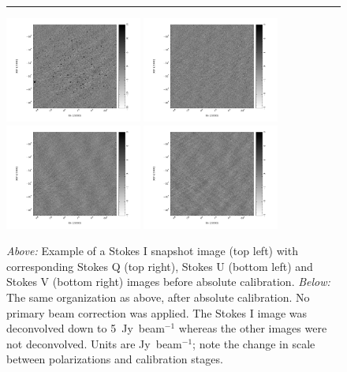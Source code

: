 \begin{figure}[h!]
\noindent\rule{14cm}{0.6pt}
\includegraphics[width=0.4\textwidth]{chapters/eor_window_PAPER/figures/zen_2455819_50285-I-image.pdf}
\includegraphics[width=0.4\textwidth]{chapters/eor_window_PAPER/figures/zen_2455819_50285-Q-image.pdf}
\includegraphics[width=0.4\textwidth]{chapters/eor_window_PAPER/figures/zen_2455819_50285-U-image.pdf}
\includegraphics[width=0.4\textwidth]{chapters/eor_window_PAPER/figures/zen_2455819_50285-V-image.pdf}
\caption[Snapshot images of Stokes parameters before and absolute calibration.]{\textit{Above:} Example of a Stokes I snapshot image (top left) with corresponding Stokes Q (top right), Stokes U (bottom left) and Stokes V (bottom right) images before absolute calibration. \textit{Below:} The same organization as above, after absolute calibration. No primary beam correction was applied. The Stokes I image was deconvolved down to 5~Jy~beam$^{-1}$ whereas the other images were not deconvolved. 
Units are Jy~beam$^{-1}$; note the change in scale between polarizations and calibration stages.}
\label{fig:psa32_sky_image}
\end{figure}

